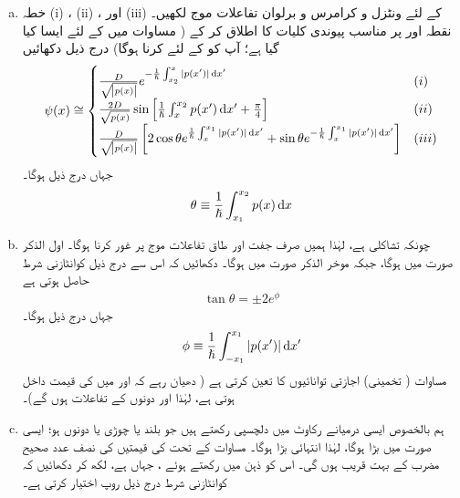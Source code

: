 \begin{enumerate}[a.]

\item
خطہ (i) ، (ii) ، اور (iii)  کے لئے ونٹزل و کرامرس و برلوان تفاعلات موج لکھیں۔ نقطہ  اور  پر مناسب پیوندی کلیات کا اطلاق کر کے ( مساوات  میں  کے لئے ایسا کیا گیا ہے؛ آپ کو  کے لئے کرنا ہوگا) درج ذیل دکھائیں
\begin{align*}
	\psi(x)\cong
	\begin{cases}
		\frac{D}{\sqrt{\abs{p(x)}}} e^{-\frac{1}{\hslash}\int^{x}_{x_{2}}|p(x')|\dif x'}& (i) \\
		\frac{2D}{\sqrt{p(x)}} \sin\left[\frac{1}{\hslash}\int^{x_{2}}_{x}p(x')\dif x'+\frac{\pi}{4}\right]& (ii) \\
		\frac{D}{\sqrt{\abs{p(x)}}}\left[2 \cos\theta e^{\frac{1}{\hslash}\int^{x_{1}}_{x}|p(x')|\dif x'} +\sin\theta e^{-\frac{1}{\hslash}\int^{x_{1}}_{x}|p(x')|\dif x'}\right]& (iii)
	\end{cases}
\end{align*}
جہاں درج ذیل ہوگا۔
\begin{align}\label{مساوات_وقب_تھیٹا}
	\theta\equiv\frac{1}{\hslash}\int^{x_{2}}_{x_{1}}p(x)\dif x
\end{align}
\item
چونکہ  تشاکلی ہے، لہٰذا ہمیں صرف جفت  اور طاق  تفاعلات موج پر غور کرنا ہوگا۔ اول الذکر صورت میں  ہوگا، جبکہ موخر الذکر صورت میں  ہوگا۔ دکھائیں کہ اس سے درج ذیل کوانٹازنی شرط حاصل ہوتی ہے
\begin{align}\label{مساوات_وقب_ٹینجنٹ}
	\tan\theta=\pm 2e^{\phi}
\end{align}
جہاں درج ذیل ہوگا۔
\begin{align}
	\phi\equiv\frac{1}{\hslash}\int^{x_{1}}_{-x_{1}}|p(x')|\dif x'
\end{align}
مساوات  ( تخمینی) اجازتی توانائیوں کا تعین کرتی ہے ( دھیان رہے کہ  اور  میں  کی قیمت داخل ہوتی ہے، لہٰذا  اور  دونوں  کے تفاعلات ہوں گے)۔
\item
 ہم بالخصوص ایسی درمیانے رکاوٹ میں دلچسپی رکھتے ہیں جو بلند یا چوڑی یا دونوں ہو؛ ایسی صورت میں  بڑا ہوگا، لہٰذا  انتہائی بڑا ہوگا۔ مساوات  کے تحت  کی قیمتیں  کی نصف عدد صحیح مضرب کے بہت قریب ہوں گی۔ اس کو ذہن میں رکھتے ہوئے ، جہاں  ہے، لکھ کر دکھائیں کہ کوانٹازنی شرط درج ذیل روپ اختیار کرتی ہے۔

\end{enumerate}
